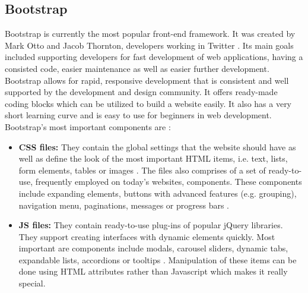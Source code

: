 \subsection{Bootstrap}
Bootstrap is currently the most popular front-end framework. It was created by Mark Otto and Jacob Thornton, developers working in Twitter \cite{FrontEndSKI}. Its main goals included supporting developers for fast development of web applications, having a consisted code, easier maintenance as well as easier further development. Bootstrap allows for rapid, responsive development that is consistent and well supported by the development and design community. It offers ready-made coding blocks which can be utilized to build a website easily. It also has a very short learning curve and is easy to use for beginners in web development. Bootstrap's most important components are \cite{FrontEndSKI}:
\begin{itemize}
	\item \textbf{CSS files:} They contain the global settings that the website should have as well as define the look of the most important HTML items, i.e. text, lists, form elements, tables or images \cite{FrontEndSKI}. The files also comprises of a set of ready-to-use, frequently employed on today’s websites, components. These components include expanding elements, buttons with advanced features (e.g. grouping), navigation menu, paginations, messages or progress bars \cite{FrontEndSKI}.
	\item \textbf{JS files:} They contain ready-to-use plug-ins of popular jQuery libraries. They support creating interfaces with dynamic elements quickly. Most important are components include modals, carousel sliders, dynamic tabs, expandable lists, accordions or tooltips \cite{FrontEndSKI}. Manipulation of these items can be done using HTML attributes rather than Javascript which makes it really special.
\end{itemize}
